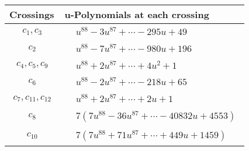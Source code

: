 \documentclass[1p]{elsarticle_modified}
\theoremstyle{definition}
\begin{document}
\begin{tabular}{m{50pt}|m{274pt}}
Crossings & \hspace{64pt}u-Polynomials at each crossing \\
\hline $$\begin{aligned}c_{1},c_{3}\end{aligned}$$&$\begin{aligned}
&u^{88}-3 u^{87}+\cdots-295 u+49
\end{aligned}$\\
\hline $$\begin{aligned}c_{2}\end{aligned}$$&$\begin{aligned}
&u^{88}-7 u^{87}+\cdots-980 u+196
\end{aligned}$\\
\hline $$\begin{aligned}c_{4},c_{5},c_{9}\end{aligned}$$&$\begin{aligned}
&u^{88}+2 u^{87}+\cdots+4 u^2+1
\end{aligned}$\\
\hline $$\begin{aligned}c_{6}\end{aligned}$$&$\begin{aligned}
&u^{88}-2 u^{87}+\cdots-218 u+65
\end{aligned}$\\
\hline $$\begin{aligned}c_{7},c_{11},c_{12}\end{aligned}$$&$\begin{aligned}
&u^{88}+2 u^{87}+\cdots+2 u+1
\end{aligned}$\\
\hline $$\begin{aligned}c_{8}\end{aligned}$$&$\begin{aligned}
&7(7 u^{88}-36 u^{87}+\cdots-40832 u+4553)
\end{aligned}$\\
\hline $$\begin{aligned}c_{10}\end{aligned}$$&$\begin{aligned}
&7(7 u^{88}+71 u^{87}+\cdots+449 u+1459)
\end{aligned}$\\
\hline
\end{tabular}\\~\\
\newpage\renewcommand{\arraystretch}{1}
\end{document}
